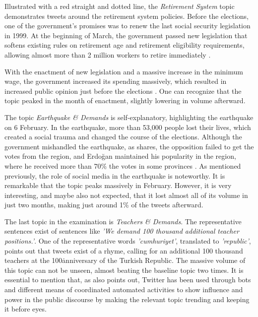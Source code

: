 Illustrated with a red straight and dotted line, the \textit{Retirement System} topic demonstrates tweets 
around the retirement system policies. Before the elections, one of the government's promises was to renew 
the last social security legislation in 1999. At the beginning of March, the government passed new legislation 
that softens existing rules on retirement age and retirement eligibility requirements, allowing almost more 
than 2 million workers to retire immediately \parencite{erdem_bisgin_retirement_2023}. 

With the enactment of new legislation and a massive increase in the minimum wage, the government increased its 
spending massively, which resulted in increased public opinion just before the elections 
\parencite{cevik_aksoy_turkey_earthquake_2023}. One can recognize that the topic peaked in the month of 
enactment, slightly lowering in volume afterward.

The topic \textit{Earthquake \& Demands} is self-explanatory, highlighting the earthquake on 6 February. 
In the earthquake, more than 53,000 people lost their lives, which created a social trauma and changed the 
course of the elections. Although the government mishandled the earthquake, as 
\textcite{cevik_aksoy_aydin_turkey_after_elections_2023} shares, the opposition failed to get the votes 
from the region, and Erdoğan maintained his popularity in the region, where he received more than 
70\% the votes in some provinces \parencite{michaelson_narli_earthquake_regions_erdogan_2023}.
As mentioned previously, the role of social media in the earthquake is noteworthy.
It is remarkable that the topic peaks massively in February. However, it is very interesting, and maybe 
also not expected, that it lost almost all of its volume in just two months, making just around 
1\% of the tweets afterward. 

The last topic in the examination is \textit{Teachers \& Demands}. The representative sentences exist 
of sentences like \textit{'We demand 100 thousand additional teacher positions.'}. One of the 
representative words \textit{'cumhuriyet'}, translated to \textit{'republic'}, points out that tweets 
exist of a rhyme, calling for an additional 100 thousand teachers at the 100\. anniversary of the Turkish 
Republic. The massive volume of this topic can not be unseen, almost beating the baseline topic two times. 
It is essential to mention that, as \textcite{pfeffer_twitter_24_Hours_just_another_day_2023} also points 
out, Twitter has been used through bots and different means of coordinated automated activities to show 
influence and power in the public discourse by making the relevant topic trending and keeping it before eyes.



